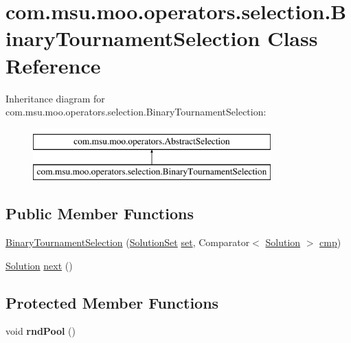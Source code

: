 \hypertarget{classcom_1_1msu_1_1moo_1_1operators_1_1selection_1_1BinaryTournamentSelection}{\section{com.\-msu.\-moo.\-operators.\-selection.\-Binary\-Tournament\-Selection Class Reference}
\label{classcom_1_1msu_1_1moo_1_1operators_1_1selection_1_1BinaryTournamentSelection}
}
Inheritance diagram for com.\-msu.\-moo.\-operators.\-selection.\-Binary\-Tournament\-Selection\-:\begin{figure}[H]
\begin{center}
\leavevmode
\includegraphics[height=2.000000cm]{classcom_1_1msu_1_1moo_1_1operators_1_1selection_1_1BinaryTournamentSelection}
\end{center}
\end{figure}
\subsection*{Public Member Functions}
\begin{DoxyCompactItemize}
\item 
\hyperlink{classcom_1_1msu_1_1moo_1_1operators_1_1selection_1_1BinaryTournamentSelection_a278003df852eb1ec89e0b41d313fcd01}{Binary\-Tournament\-Selection} (\hyperlink{classcom_1_1msu_1_1moo_1_1model_1_1solution_1_1SolutionSet}{Solution\-Set} \hyperlink{classcom_1_1msu_1_1moo_1_1operators_1_1AbstractSelection_ade84bd57f9d26c9d9b2e90bb6591b79c}{set}, Comparator$<$ \hyperlink{classcom_1_1msu_1_1moo_1_1model_1_1solution_1_1Solution}{Solution} $>$ \hyperlink{classcom_1_1msu_1_1moo_1_1operators_1_1selection_1_1BinaryTournamentSelection_ad167c5ef80c4ad0a0f1741bea8be5117}{cmp})
\item 
\hyperlink{classcom_1_1msu_1_1moo_1_1model_1_1solution_1_1Solution}{Solution} \hyperlink{classcom_1_1msu_1_1moo_1_1operators_1_1selection_1_1BinaryTournamentSelection_a061f5f41208fcecb04a559e7ed6e32d7}{next} ()
\end{DoxyCompactItemize}
\subsection*{Protected Member Functions}
\begin{DoxyCompactItemize}
\item 
\hypertarget{classcom_1_1msu_1_1moo_1_1operators_1_1selection_1_1BinaryTournamentSelection_a05157f4022e4c1785b25f8028a7e3e79}{void {\bfseries rnd\-Pool} ()}\label{classcom_1_1msu_1_1moo_1_1operators_1_1selection_1_1BinaryTournamentSelection_a05157f4022e4c1785b25f8028a7e3e79}

\end{DoxyCompactItemize}
